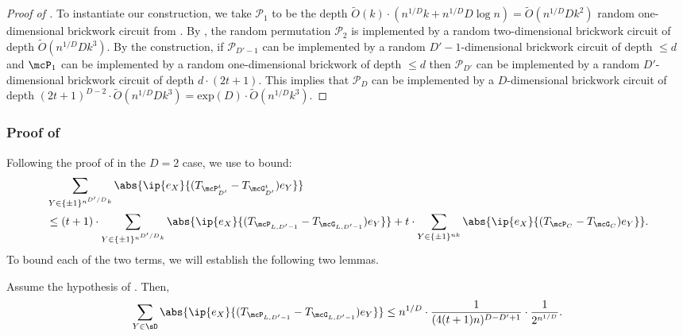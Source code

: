 \begin{proof}[Proof of ]
    To instantiate our construction, we take $\mathcal{P}_1$ to be the depth $\widetilde{O}(k)\cdot (n^{1/D}k + n^{1/D}D\log n)=\widetilde{O}(n^{1/D}Dk^2)$ random one-dimensional brickwork circuit from . By , the random permutation $\mathcal{P}_2$ is implemented by a random two-dimensional brickwork circuit of depth $\widetilde{O}(n^{1/D}Dk^3)$. By the construction, if $\mathcal{P}_{D'-1}$ can be implemented by a random $D'-1$-dimensional brickwork circuit of depth $\leq d$ and $\mcP_1$ can be implemented by a random one-dimensional brickwork of depth $\leq d$ then $\mathcal{P}_{D'}$ can be implemented by a random $D'$-dimensional brickwork circuit of depth $d\cdot(2t+1)$. This implies that $\mathcal{P}_D$ can be implemented by a $D$-dimensional brickwork circuit of depth $(2t+1)^{D-2}\cdot \widetilde{O}(n^{1/D}Dk^3)=\mathrm{exp}(D)\cdot \widetilde{O}(n^{1/D}k^3)$. 
\end{proof}


\subsubsection{Proof of }
Following the proof of  in the $D = 2$ case, we use  to bound:
\begin{align*}
     &\sum_{Y \in \{\pm1\}^{n^{D'/D}k}} \abs{\ip{e_X}{(T_{\mcP_{D'}^t}-T_{\mcG^t_{D'}}) e_Y}}\\
     &\leq (t+1) \cdot \sum_{Y \in \{\pm1\}^{n^{D'/D}k}} \abs{\ip{e_X}{(T_{\mcP_{L, D'-1}}-T_{\mcG_{L, D'-1}}) e_Y}} + t \cdot \sum_{Y \in \{\pm1\}^{nk}} \abs{\ip{e_X}{(T_{\mcP_C}-T_{\mcG_C}) e_Y}}.
\end{align*}
To bound each of the two terms, we will establish the following two lemmas.
\begin{lemma}\label{lem:genlatticereduced}
    Assume the hypothesis of . Then,
    \begin{align*}
        \sum_{Y \in \sD} \abs{\ip{e_X}{(T_{\mcP_{L, D'-1}}-T_{\mcG_{L, D'-1}}) e_Y}} \leq n^{1/D}\cdot \frac{1}{(4(t+1)n)^{D-D'+1}} \cdot \frac1{2^{n^{1/D}}}.
    \end{align*}
\end{lemma}

